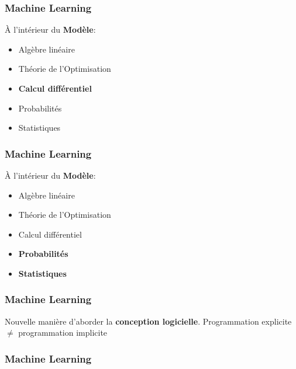 \documentclass{formation}
\begin{document}
\begin{frame}
  \frametitle{Machine Learning}
  \begin{minipage}[c]{0.41\linewidth}
    À l'intérieur du \textbf{Modèle}:
    \begin{itemize}
    \item Algèbre linéaire
    \item Théorie de l'Optimisation
    \item \textbf{Calcul différentiel}
    \item Probabilités
    \item Statistiques
    \end{itemize}
  \end{minipage}\hfill
  \begin{minipage}[c]{0.58\linewidth}
  \end{minipage}\hfill
\end{frame}

\begin{frame}
  \frametitle{Machine Learning}
  \begin{minipage}[c]{0.41\linewidth}
    À l'intérieur du \textbf{Modèle}:
    \begin{itemize}
    \item Algèbre linéaire
    \item Théorie de l'Optimisation
    \item Calcul différentiel
    \item \textbf{Probabilités}
    \item \textbf{Statistiques}
    \end{itemize}
  \end{minipage}\hfill
  \begin{minipage}[c]{0.58\linewidth}
  \end{minipage}\hfill
\end{frame}

\begin{frame}
  \frametitle{Machine Learning}
  Nouvelle manière d'aborder la \textbf{conception logicielle}.
  \newline
  \newline
  Programmation explicite $\neq$ programmation implicite
\end{frame}

\begin{frame}
  \frametitle{Machine Learning}
\end{frame}
\end{document}
